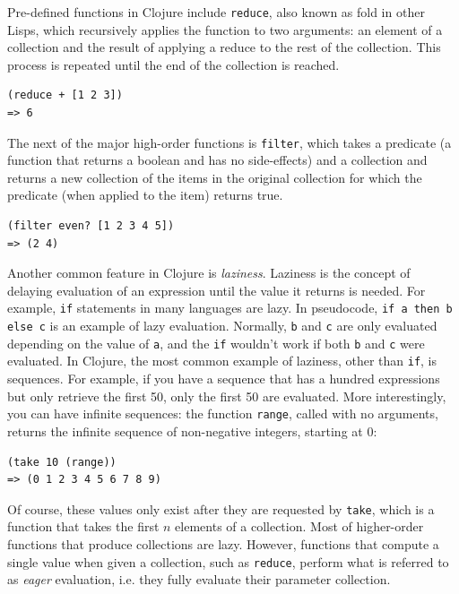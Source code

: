 \documentclass[12pt]{article}
\newcommand{\comment}[1]{{\bf \tt  {#1}}}
\newcommand{\emcomment}[1]{\textcolor{ForestGreen}{\comment{Elena: {#1}}}}
\newcommand{\clocode}[1]{{\texttt {#1}}}
\begin{document}
Pre-defined functions in Clojure include \clocode{reduce}, also known as fold in other Lisps, which recursively applies the function to two arguments: an element of a collection and the result of applying a reduce to the rest of the collection. This process is repeated until the end of the collection is reached. 
\begin{verbatim}
(reduce + [1 2 3])
=> 6
\end{verbatim}
The next of the major high-order functions is \clocode{filter}, which takes a predicate (a function that returns a boolean and has no side-effects) and a collection and returns a new collection of the items in the original collection for which the predicate (when applied to the item) returns true.
\begin{verbatim}
(filter even? [1 2 3 4 5])
=> (2 4)
\end{verbatim}
Another common feature in Clojure is {\it  laziness}. Laziness is the concept of delaying evaluation of an expression until the value it returns is needed. For example, \clocode{if} statements in many languages are lazy. In pseudocode, \clocode{if a then b else c} is an example of lazy evaluation. Normally, \clocode{b} and \clocode{c} are only evaluated depending on the value of \clocode{a}, and the \clocode{if} wouldn't work if both \clocode{b} and \clocode{c} were evaluated. 
In Clojure, the most common example of laziness, other than \clocode{if}, is sequences. For example, if you have a sequence that has a hundred expressions but only retrieve the first 50, only the first 50 are evaluated. More interestingly, you can have infinite sequences: the function \clocode{range}, called with no arguments, returns the infinite sequence of non-negative integers, starting at 0:
\begin{verbatim}
(take 10 (range))
=> (0 1 2 3 4 5 6 7 8 9)
\end{verbatim}
Of course, these values only exist after they are requested by \clocode{take}, which is a function that takes the first $n$ elements of a collection. 
Most of higher-order functions that produce collections are lazy. However, functions that compute a single value when given a collection, such as \clocode{reduce}, perform what is referred to as {\it  eager} evaluation, i.e. they fully evaluate their parameter collection. 
\end{document}
